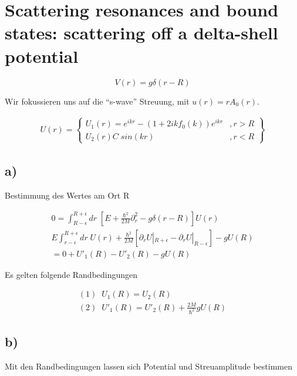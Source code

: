 \section{Scattering resonances and bound states: scattering off a delta-shell
potential}

\begin{equation}
V \left(r\right) = g \delta\left(r-R\right)
\end{equation}

Wir fokussieren uns auf die ``s-wave'' Streuung, mit
$u\left(r\right)=rA_0\left(r\right)$.

\begin{align}
U \left(r\right) =
\begin{Bmatrix}
U_1 \left(r\right) = e^{ikr} - \left(1+2ikf_0\left(k\right) \right) e^{ikr} &
,r>R \\
U_2 \left(r\right) C \; sin \left(kr\right) & ,r<R
\end{Bmatrix}
\end{align}

\subsection{a)}
 Bestimmung des Wertes am Ort R
 
 \begin{align}
 0 = \int_{R-\epsilon}^{R+\epsilon} dr \; \left[ E + \frac{\hbar^2}{2M}
 \partial_r^2 - g \delta \left(r-R\right) \right] U \left(r\right) \\
 E \int_{r-\epsilon}^{R+\epsilon} dr \; U \left(r\right) + \frac{\hbar^2}{2M}
 \left[ \partial_r U |_{R+\epsilon} - \partial_r U |_{R-\epsilon} \right] - g
 U\left(R\right) \\
 = 0 + U'_1 \left(R\right) - U'_2 \left(R\right) - g U \left(R\right)
 \end{align}
 
 Es gelten folgende Randbedingungen
 
 \begin{align}
 \left(1\right) \; \; U_1 \left(R\right) = U_2 \left(R\right) \\
 \left(2\right) \; \;  U'_1 \left(R\right) = U'_2 \left(R\right) +
 \frac{2M}{\hbar^2} g U \left(R\right)
 \end{align}
 
 \subsection{b)}
 
 Mit den Randbedingungen lassen sich Potential und Streuamplitude bestimmen
 
